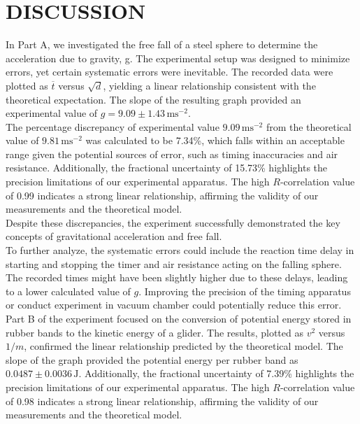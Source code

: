 \documentclass[a4paper,11pt]{article}
\begin{document}
\newpage
{}
\section*{\center DISCUSSION}
\label{sec:DISCUSSION}
\quad In Part A, we investigated the free fall of a steel sphere to determine the acceleration due to gravity, g. The experimental setup was designed to minimize errors, yet certain systematic errors were inevitable. The recorded data were plotted as \(\overline{t}\) versus \(\sqrt{d}\), yielding a linear relationship consistent with the theoretical expectation. The slope of the resulting graph provided an experimental value of \(g = 9.09 \pm 1.43 \, \text{ms}^{-2}\).\\

The percentage discrepancy of experimental value \(9.09\, \text{ms}^{-2}\) from the theoretical value of \(9.81 \, \text{ms}^{-2}\) was calculated to be 7.34\%, which falls within an acceptable range given the potential sources of error, such as timing inaccuracies and air resistance. Additionally, the fractional uncertainty of 15.73\% highlights the precision limitations of our experimental apparatus. The high \(R\)-correlation value of 0.99 indicates a strong linear relationship, affirming the validity of our measurements and the theoretical model.\\Despite these discrepancies, the experiment successfully demonstrated the key concepts of gravitational acceleration and free fall.\\

To further analyze, the systematic errors could include the reaction time delay in starting and stopping the timer and air resistance acting on the falling sphere. The recorded times might have been slightly higher due to these delays, leading to a lower calculated value of \(g\). Improving the precision of the timing apparatus or conduct experiment in vacuum chamber could potentially reduce this error.\\

Part B of the experiment focused on the conversion of potential energy stored in rubber bands to the kinetic energy of a glider. The results, plotted as \(v^2\) versus \(1/m\), confirmed the linear relationship predicted by the theoretical model. The slope of the graph provided the potential energy per rubber band as \(0.0487 \pm 0.0036 \, \text{J}\). Additionally, the fractional uncertainty of 7.39\% highlights the precision limitations of our experimental apparatus. The high \(R\)-correlation value of 0.98 indicates a strong linear relationship, affirming the validity of our measurements and the theoretical model.\\
\end{document}
